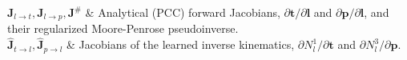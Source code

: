 $\mathbf{J}_{l \to t}, \mathbf{J}_{l \to p}, \mathbf{J}^{\#}$ & Analytical (PCC) forward Jacobians, $\partial \mathbf{t}/\partial \mathbf{l}$ and $\partial \mathbf{p}/\partial \mathbf{l}$, and their regularized Moore-Penrose pseudoinverse. \\
$\hat{\mathbf{J}}_{t \to l}, \hat{\mathbf{J}}_{p \to l}$ & Jacobians of the learned inverse kinematics, $\partial N_l^1/\partial \mathbf{t}$ and $\partial N_l^3/\partial \mathbf{p}$. \\
